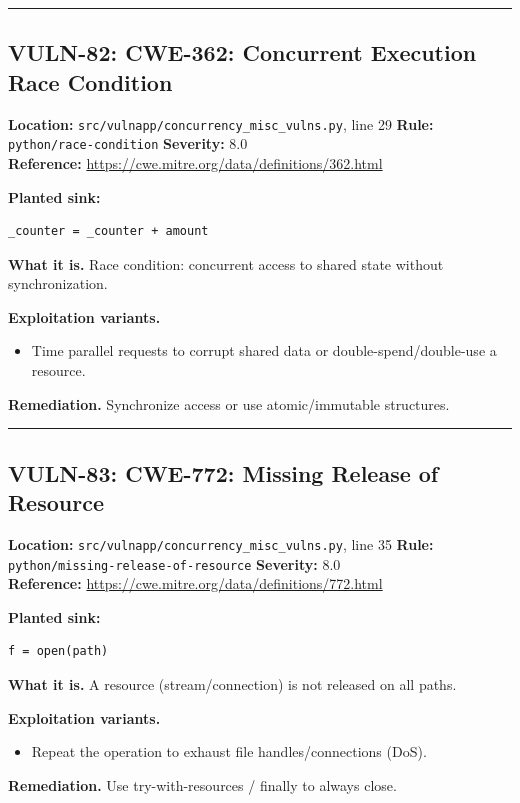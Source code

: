 \documentclass[11pt,a4paper]{article}
\begin{document}
\vspace{4pt}\hrule\vspace{6pt}
\subsection{VULN-82: CWE-362: Concurrent Execution Race Condition}
\noindent\textbf{Location:} \texttt{src/vulnapp/concurrency\_misc\_vulns.py}, line 29 \quad \textbf{Rule:} \texttt{python/race-condition} \quad \textbf{Severity:} 8.0
\\ \textbf{Reference:} \url{https://cwe.mitre.org/data/definitions/362.html}

\noindent\textbf{Planted sink:}
\begin{lstlisting}
_counter = _counter + amount
\end{lstlisting}
\noindent\textbf{What it is.} Race condition: concurrent access to shared state without synchronization.

\noindent\textbf{Exploitation variants.}
\begin{itemize}[leftmargin=1.4em,itemsep=1pt,topsep=2pt]
\item Time parallel requests to corrupt shared data or double-spend/double-use a resource.
\end{itemize}
\noindent\textbf{Remediation.} Synchronize access or use atomic/immutable structures.

\vspace{4pt}\hrule\vspace{6pt}
\subsection{VULN-83: CWE-772: Missing Release of Resource}
\noindent\textbf{Location:} \texttt{src/vulnapp/concurrency\_misc\_vulns.py}, line 35 \quad \textbf{Rule:} \texttt{python/missing-release-of-resource} \quad \textbf{Severity:} 8.0
\\ \textbf{Reference:} \url{https://cwe.mitre.org/data/definitions/772.html}

\noindent\textbf{Planted sink:}
\begin{lstlisting}
f = open(path)
\end{lstlisting}
\noindent\textbf{What it is.} A resource (stream/connection) is not released on all paths.

\noindent\textbf{Exploitation variants.}
\begin{itemize}[leftmargin=1.4em,itemsep=1pt,topsep=2pt]
\item Repeat the operation to exhaust file handles/connections (DoS).
\end{itemize}
\noindent\textbf{Remediation.} Use try-with-resources / finally to always close.
\end{document}
